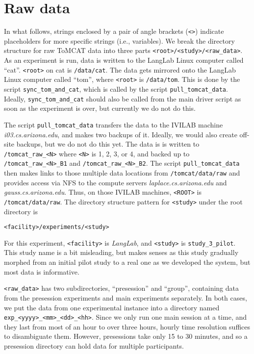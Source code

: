 \section{Raw data}

In what follows, strings enclosed by a pair of angle brackets (\verb|<>|) indicate
placeholders for more specific strings (i.e., variables).
We break the directory structure for raw ToMCAT data into three parts
\verb|<root>/<study>/<raw_data>|.
As an experiment is run, data is written to the LangLab Linux computer called
``cat''. \verb|<root>| on cat is
\verb|/data/cat|. The data gets mirrored onto the LangLab Linux computer called
``tom'', where \verb|<root>| is \verb|/data/tom|.
This is done by the script \verb|sync_tom_and_cat|, which is called by the script
\verb|pull_tomcat_data|. Ideally, \verb|sync_tom_and_cat| should also be
called from the main driver script as soon as the experiment is over, but
currently we do not do this.

The script \verb|pull_tomcat_data| transfers the data to the IVILAB machine
\textit{i03.cs.arizona.edu}, and makes two backups of it.  Ideally, we would
also create off-site backups, but we do not do this yet. The data is is
written to
\verb|/tomcat_raw_<N>| where \verb|<N>| is 1, 2, 3, or 4, and backed up to
\verb|/tomcat_raw_<N>_B1| and \verb|/tomcat_raw_<N>_B2|.
The script \verb|pull_tomcat_data| then makes links to those multiple data
locations from \verb|/tomcat/data/raw| and provides access via NFS to the compute
servers \textit{laplace.cs.arizona.edu} and \textit{gauss.cs.arizona.edu}.
Thus, on those IVILAB machines, \verb|<ROOT>| is \verb|/tomcat/data/raw|.
The directory structure pattern for \verb|<study>| under the root directory is

\begin{verbatim}
<facility>/experiments/<study>
\end{verbatim}

For this experiment, \verb|<facility>| is \textit{LangLab}, and \verb|<study>|
is \verb|study_3_pilot|.  This study name is a bit misleading, but makes senses
as this study gradually morphed from an initial pilot study to a real one as we
developed the system, but most data is informative.

\verb|<raw_data>| has two subdirectories, ``presession'' and ``group'', containing data
from the presession experiments and main experiments separately. In both cases, we put the
data from one experimental instance into a directory named
\verb|exp_<yyyy>_<mm>_<dd>_<hh>|. Since we only run one main session at a time, and
they last from most of an hour to over three hours, hourly time resolution
suffices to disambiguate them. However, presessions take only 15 to 30 minutes,
and so a presession directory can hold data for multiple participants.

